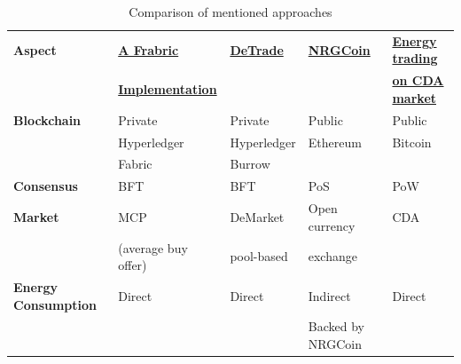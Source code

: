 \begin{table}[h!]
    \centering
    \begin{tabular}{l|llll}
        \textbf{Aspect}         & \textbf{\hyperref[sec:hfi]{A Frabric}}      & \textbf{\hyperref[sec:dtr]{DeTrade}} & \textbf{\hyperref[sec:nrgc]{NRGCoin}} & \textbf{\hyperref[sec:cda]{Energy trading}} \\
                                & \textbf{\hyperref[sec:hfi]{Implementation}} &                                      &                                       & \textbf{\hyperref[sec:cda]{on CDA market}}  \\
        \hline
        \textbf{Blockchain}     & Private                                     & Private                              & Public                                & Public                                      \\
                                & Hyperledger                                 & Hyperledger                          & Ethereum                              & Bitcoin                                     \\
                                & Fabric                                      & Burrow                               &                                       &                                             \\[5pt]
        \textbf{Consensus}      & BFT                                         & BFT                                  & PoS                                   & PoW                                         \\[5pt]
        \textbf{Market}         & MCP                                         & DeMarket                             & Open currency                         & CDA                                         \\
                                & (average buy offer)                         & pool-based                           & exchange                              &                                             \\[5pt]
        \textbf{Energy Consumption} & Direct                                      & Direct                               & Indirect                              & Direct                                      \\
                                &                                             &                                      & Backed by NRGCoin                     &                                             \\[5pt]
    \end{tabular}
    \caption{Comparison of mentioned approaches}
\end{table}

